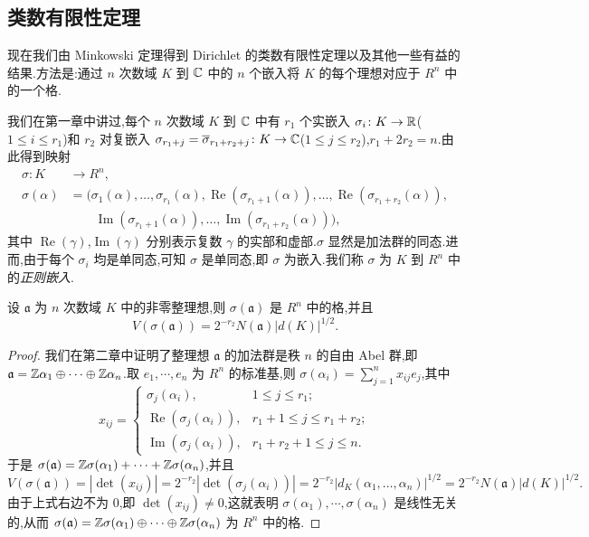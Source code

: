 \subsection{类数有限性定理}\label{sec:ch3-s1-3}

现在我们由 Minkowski 定理得到 Dirichlet 的类数有限性定理以及其他一些有益的结果.方法是:通过 $n$ 次数域 $K$ 到 $\mathbb{C}$ 中的 $n$ 个嵌入将 $K$ 的每个理想对应于 $R^n$ 中的一个格.

\begin{sloppypar}
我们在第一章中讲过,每个 $n$ 次数域 $K$ 到 $\mathbb{C}$ 中有 $r_1$ 个实嵌入 $\sigma_i\colon K\to\mathbb{R}$($1\leqslant i\leqslant r_1$)和 $r_2$ 对复嵌入 $\sigma_{r_1+j}=\overline{\sigma}_{r_1+r_2+j}\colon K\to\mathbb{C}$($1\leqslant j\leqslant r_2$),$r_1+2r_2=n$.由此得到映射
\begin{align*}
  \sigma\colon K&\to R^n,\\
  \sigma(\alpha)&=(\sigma_1(\alpha),\dots,\sigma_{r_1}(\alpha),\operatorname{Re}(\sigma_{r_1+1}(\alpha)),\dots,\operatorname{Re}(\sigma_{r_1+r_2}(\alpha)),\\
  &\qquad\operatorname{Im}(\sigma_{r_1+1}(\alpha)),\dots,\operatorname{Im}(\sigma_{r_1+r_2}(\alpha))),
\end{align*}
其中 $\operatorname{Re}(\gamma)$,$\operatorname{Im}(\gamma)$ 分别表示复数 $\gamma$ 的实部和虚部.$\sigma$ 显然是加法群的同态.进而,由于每个 $\sigma_i$ 均是单同态,可知 $\sigma$ 是单同态,即 $\sigma$ 为嵌入.我们称 $\sigma$ 为 $K$ 到 $R^n$ 中的\emph{正则嵌入}.
\end{sloppypar}

\begin{lemma}\label{lem:ch3-3}
设 $\mathfrak{a}$ 为 $n$ 次数域 $K$ 中的非零整理想,则 $\sigma(\mathfrak{a})$ 是 $R^n$ 中的格,并且
\[
  V(\sigma(\mathfrak{a}))=2^{-r_2}N(\mathfrak{a})|d(K)|^{1/2}.
\]
\end{lemma}

\begin{proof}
我们在第二章中证明了整理想 $\mathfrak{a}$ 的加法群是秩 $n$ 的自由 Abel 群,即 $\mathfrak{a}=\mathbb{Z}\alpha_1\oplus\cdots\oplus\mathbb{Z}\alpha_n$.取 $e_1,\cdots,e_n$ 为 $R^n$ 的标准基,则 $\sigma(\alpha_i)=\sum_{j=1}^{n}x_{ij}e_j$,其中
\[
  x_{ij}=\begin{cases}
    \sigma_j(\alpha_i), & 1\leqslant j\leqslant r_1;\\
    \operatorname{Re}(\sigma_j(\alpha_i)), & r_1+1\leqslant j\leqslant r_1+r_2;\\
    \operatorname{Im}(\sigma_j(\alpha_i)), & r_1+r_2+1\leqslant j\leqslant n.
  \end{cases}
\]
于是 $\sigma(\mathfrak{a})=\mathbb{Z}\sigma(\alpha_1)+\cdots+\mathbb{Z}\sigma(\alpha_n)$,并且
\[
  V(\sigma(\mathfrak{a}))=|\det(x_{ij})|=2^{-r_2}|\det(\sigma_j(\alpha_i))|
  =2^{-r_2}|d_K(\alpha_1,\dots,\alpha_n)|^{1/2}
  =2^{-r_2}N(\mathfrak{a})|d(K)|^{1/2}.
\]
由于上式右边不为 $0$,即 $\det(x_{ij})\neq 0$,这就表明 $\sigma(\alpha_1),\cdots,\sigma(\alpha_n)$ 是线性无关的,从而 $\sigma(\mathfrak{a})=\mathbb{Z}\sigma(\alpha_1)\oplus\cdots\oplus\mathbb{Z}\sigma(\alpha_n)$ 为 $R^n$ 中的格.
\end{proof}

